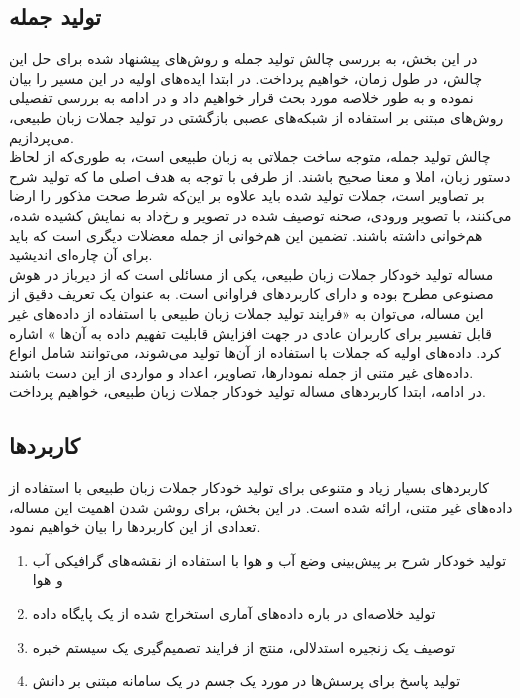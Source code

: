 \subsection{تولید جمله}
در این بخش، به بررسی چالش تولید جمله و روش‌های پیشنهاد شده برای حل این چالش، در طول زمان، خواهیم پرداخت. در ابتدا ایده‌های اولیه در این مسیر را بیان نموده و به طور خلاصه مورد بحث قرار خواهیم داد و در ادامه به بررسی تفصیلی روش‌های مبتنی بر استفاده از شبکه‌های عصبی بازگشتی در تولید جملات زبان طبیعی، می‌پردازیم.
\\
 چالش تولید جمله، متوجه ساخت جملاتی به زبان طبیعی است، به طوری‌که از لحاظ دستور زبان، املا و معنا صحیح باشند. از طرفی با توجه به هدف اصلی ما که تولید شرح بر تصاویر است، جملات تولید شده باید علاوه بر این‌که شرط صحت مذکور را ارضا می‌کنند، با تصویر ورودی، صحنه توصیف شده در تصویر و رخ‌داد به نمایش کشیده شده، هم‌خوانی داشته باشند. تضمین این هم‌خوانی از جمله معضلات دیگری است که باید برای آن چاره‌ای اندیشید.
\\
مساله تولید خودکار جملات زبان طبیعی، یکی از مسائلی است که از دیرباز در هوش مصنوعی مطرح بوده و دارای کاربردهای فراوانی است. به عنوان یک تعریف دقیق از این مساله، می‌توان به «فرایند تولید جملات زبان طبیعی با استفاده از داده‌های غیر قابل تفسیر برای کاربران عادی در جهت افزایش قابلیت تفهیم داده‌ به آن‌ها \cite{reiter1997building}» اشاره کرد. داده‌های اولیه که جملات با استفاده از آن‌ها تولید می‌شوند، می‌توانند شامل انواع داده‌های غیر متنی از جمله نمودارها، تصاویر، اعداد و مواردی از این دست باشند.
\\
در ادامه، ابتدا کاربردهای مساله تولید خودکار جملات زبان طبیعی، خواهیم پرداخت.


\subsection[کاربردها]{کاربردها \cite{reiter1997building}}
کاربردهای بسیار زیاد و متنوعی برای تولید خودکار جملات زبان طبیعی با استفاده از داده‌های غیر متنی، ارائه شده است. در این بخش، برای روشن شدن اهمیت این مساله، تعدادی از این کاربردها را بیان خواهیم نمود.
\\
\begin{enumerate}
\item
تولید خودکار شرح بر پیش‌بینی وضع آب و هوا با استفاده از نقشه‌های گرافیکی آب و هوا
\item 
تولید خلاصه‌ای در باره داده‌های آماری استخراج شده از یک پایگاه داده 
\item
توصیف یک زنجیره استدلالی، منتج از فرایند تصمیم‌گیری یک سیستم خبره
\item
تولید پاسخ برای پرسش‌ها در مورد یک جسم در یک سامانه مبتنی بر دانش
\end{enumerate}

